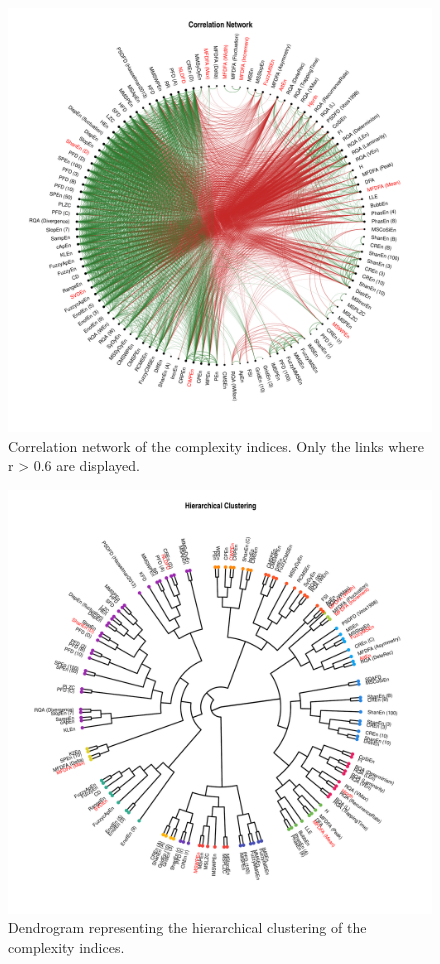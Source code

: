 \documentclass[
  man]{apa6}
\begin{document}
\begin{figure}
\centering
\includegraphics{manuscript_files/figure-latex/ggm-1.pdf}
\caption{\label{fig:ggm}Correlation network of the complexity indices. Only the links where \textbar r\textbar{} \textgreater{} 0.6 are displayed.}
\end{figure}

\begin{figure}
\centering
\includegraphics{manuscript_files/figure-latex/clustering-1.pdf}
\caption{\label{fig:clustering}Dendrogram representing the hierarchical clustering of the complexity indices.}
\end{figure}
\end{document}

